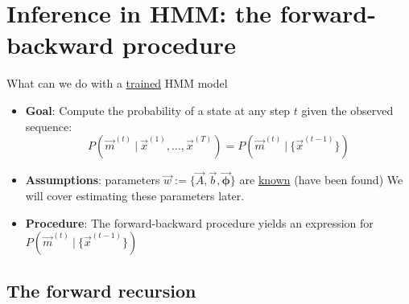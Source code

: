 \section{Inference in HMM: the forward-backward procedure}

\begin{frame} 
    \begin{center}
    What can we do with a \underline{trained} HMM model
    \end{center}
	
\end{frame}

\begin{frame}

\begin{itemize}
\item[] \textbf{Goal}: Compute the probability of a state at any step $t$ given the observed sequence:
\begin{equation}
P(\vec{m}^{(t)}  ~|~ \vec{x}^{(1)},  \ldots,\vec{x}^{(T)}) =
		P(\vec{m}^{(t)}  ~|~ \{\vec{x}^{(t-1)}\})
\end{equation}

\item[] \textbf{Assumptions}: parameters $\vec{w} := \{
		\vec{A},
		\vec{b},
		\vec{\boldsymbol{\phi}}
		\}$ are \underline{known} (have been found) We will cover estimating these parameters later.
\item[] \textbf{Procedure}: The forward-backward procedure yields an expression for $P(\vec{m}^{(t)}  ~|~ \{\vec{x}^{(t-1)}\})$

\end{itemize}

\end{frame}

\subsection{The forward recursion}

